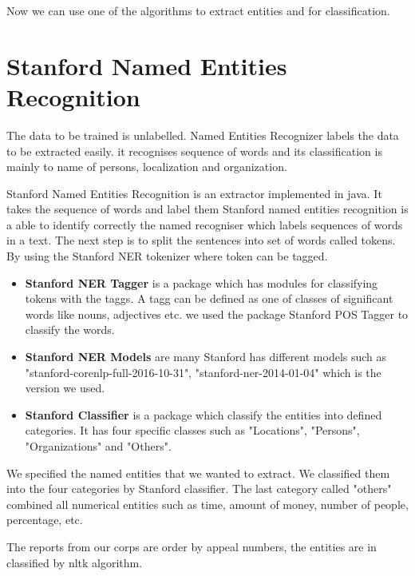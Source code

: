 Now  we can use  one of the algorithms to extract entities and for classification.

\section{Stanford Named Entities Recognition}

The data to be trained is unlabelled. Named Entities Recognizer labels the data to be extracted easily. it recognises sequence of words and its classification is mainly to name of persons, localization and organization.

Stanford Named Entities Recognition is an extractor implemented in java. It takes the sequence of words and label them 
Stanford named entities recognition is  a able to identify correctly the named recogniser which labels sequences of words in a text. The next step is to split the sentences into set of words called tokens. By using the Stanford NER tokenizer  where token can be tagged. 

\begin{itemize} 
\item \textbf{Stanford NER Tagger} is a package which has modules for classifying tokens with the taggs. A tagg can be defined as one of classes of significant words like nouns, adjectives etc. we used the package Stanford POS Tagger to classify the words. 
\item \textbf{Stanford NER Models} are many Stanford has different models such as "stanford-corenlp-full-2016-10-31", "stanford-ner-2014-01-04" which is the version we used. 

\item \textbf{Stanford Classifier} is a package which classify the entities into defined categories. It has four specific classes such as  "Locations",  "Persons",  "Organizations" and    "Others".
\end{itemize}

We specified the named entities that we wanted to extract. We classified them into the four categories by Stanford classifier.  The last category called "others" combined all numerical entities such as time, amount of money, number of people, percentage, etc. 

The reports from our corps are order by appeal numbers, the entities are in classified by nltk algorithm. 

\newpage

